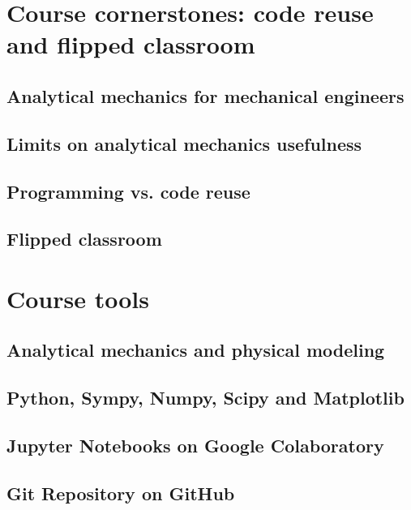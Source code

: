 \documentclass[runningheads]{llncs}
\begin{document}
\section{Course cornerstones: code reuse and flipped classroom}

\subsection{Analytical mechanics for mechanical engineers}


\subsection{Limits on analytical mechanics usefulness}


\subsection{Programming vs. code reuse}


\subsection{Flipped classroom}


\section{Course tools}

\subsection{Analytical mechanics and physical modeling}


\subsection{Python, Sympy, Numpy, Scipy and Matplotlib}


\subsection{Jupyter Notebooks on Google Colaboratory}


\subsection{Git Repository on GitHub}

\label{sec:git}
\end{document}

